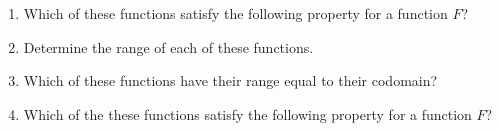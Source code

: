 \begin{previewactivity}
\begin{enumerate}

\item Which of these functions satisfy the following property for a function  $F$?


\item Determine the range of each of these functions.

\item Which of these functions have their range equal to their codomain?

\item Which of the these functions satisfy the following property for a function  $F$?

\end{enumerate}
\end{previewactivity}
\hbreak

\endinput
